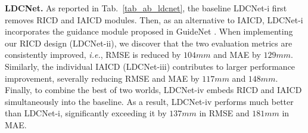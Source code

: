 \documentclass{article}
\begin{document}
\textbf{LDCNet.} As reported in Tab.~\ref{tab_ab_ldcnet}, the baseline LDCNet-i 
first removes RICD and IAICD modules. Then, as an alternative to IAICD, LDCNet-i incorporates the guidance module proposed in GuideNet \cite{tang2020learning}. When implementing our RICD design (LDCNet-ii), we discover that the two evaluation metrics are consistently improved, \emph{i.e.}, RMSE is reduced by $104mm$ and MAE by $129mm$. Similarly, the individual IAICD (LDCNet-iii) contributes to larger performance improvement, severally reducing RMSE and MAE by $117mm$ and $148mm$. Finally, to combine the best of two worlds, LDCNet-iv embeds RICD and IAICD simultaneously into the baseline. As a result, LDCNet-iv performs much better than LDCNet-i, significantly exceeding it by $137mm$ in RMSE and $181mm$ in MAE. 


\begin{table}
\vspace{-18pt}
\centering
\caption{Ablation on diverse-kernel RICD.}
\vspace{4pt}
\label{tab_ab_ricd}
\vspace{-8pt}
\end{table}
\end{document}
